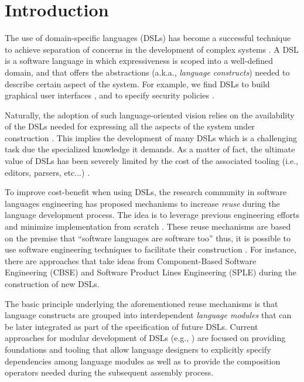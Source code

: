 \section{Introduction}
\label{sec:introduction}

The use of domain-specific languages (DSLs) has become a successful technique to achieve separation of concerns in the development of complex systems \cite{Cook:2006}. A DSL is a software language in which expressiveness is scoped into a well-defined domain, and that offers the abstractions (a.k.a., \textit{language constructs}) needed to describe certain aspect of the system. For example, we find DSLs to build graphical user interfaces \cite{Oney:2012}, and to specify security policies \cite{Lodderstedt:2002}.

Naturally, the adoption of such language-oriented vision relies on the availability of the DSLs needed for expressing all the aspects of the system under construction \cite{Clark:2013}. This implies the development of many DSLs which is a challenging task due the specialized knowledge it demands. \iffalse A language designer must own not only quite solid modeling skills but also the technical expertise for conducting the definition of specific artifacts such as grammars, metamodels, compilers, and interpreters.\fi  As a matter of fact, the ultimate value of DSLs has been severely limited by the cost of the associated tooling (i.e., editors, parsers, etc...) \cite{jezequel:2014}.

To improve cost-benefit when using DSLs, the research community in software languages engineering has proposed mechanisms to increase \textit{reuse} during the language development process. The idea is to leverage previous engineering efforts and minimize implementation from scratch \cite{Storm:2013}. These reuse mechanisms are based on the premise that ``software languages are software too'' \cite{Favre:2011} thus, it is possible to use software engineering techniques to facilitate their construction \cite{Kleppe:2009}. For instance, there are approaches that take ideas from Component-Based Software Engineering (CBSE) \cite{Cleenewerck:2003} and Software Product Lines Engineering (SPLE) \cite{Zschaler:2010} during the construction of new DSLs.

The basic principle underlying the aforementioned reuse mechanisms is that language constructs are grouped into interdependent \textit{language modules} that can be later integrated as part of the specification of future DSLs. Current approaches for modular development of DSLs (e.g., \cite{Mernik:2013,Rumpe:2010}) are focused on providing foundations and tooling that allow language designers to explicitly specify dependencies among language modules as well as to provide the composition operators needed during the subsequent assembly process.

